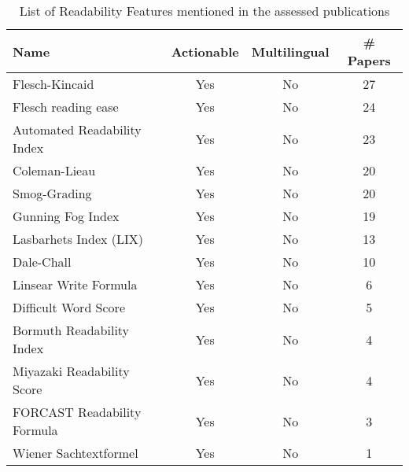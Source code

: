 \begin{table}[htbp]
    \caption{List of Readability Features mentioned in the assessed publications}
    \label{tab:feat_Readability}
    \centering
    \begin{tabular}{m{} c c c}
        \toprule
        \textbf{Name} & \textbf{Actionable} & \textbf{Multilingual} & \textbf{\# Papers} \\ 
        \midrule
        Flesch-Kincaid & Yes & No & 27 \\
        Flesch reading ease & Yes & No & 24 \\
        Automated Readability Index & Yes & No & 23 \\
        Coleman-Lieau & Yes & No & 20 \\
        Smog-Grading & Yes & No & 20 \\
        Gunning Fog Index & Yes & No & 19 \\
        Lasbarhets Index (LIX) & Yes & No & 13 \\
        Dale-Chall & Yes & No & 10 \\
        Linsear Write Formula & Yes & No & 6 \\
        Difficult Word Score & Yes & No & 5 \\
        Bormuth Readability Index & Yes & No & 4 \\
        Miyazaki Readability Score & Yes & No & 4 \\
        FORCAST Readability Formula & Yes & No & 3 \\
        Wiener Sachtextformel & Yes & No & 1 \\
        \bottomrule
    \end{tabular}
\end{table}